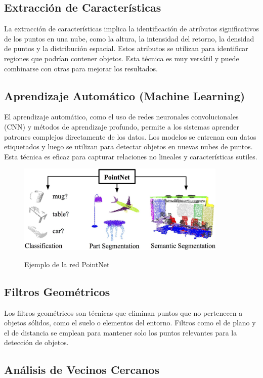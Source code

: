 \subsection{Extracción de Características}

La extracción de características implica la identificación de atributos significativos de los puntos en una nube, como la altura, la intensidad del retorno, la densidad de puntos y la distribución espacial. Estos atributos se utilizan para identificar regiones que podrían contener objetos. Esta técnica es muy versátil y puede combinarse con otras para mejorar los resultados.


\subsection{Aprendizaje Automático (Machine Learning)}

El aprendizaje automático, como el uso de redes neuronales convolucionales (CNN) y métodos de aprendizaje profundo, permite a los sistemas aprender patrones complejos directamente de los datos. Los modelos se entrenan con datos etiquetados y luego se utilizan para detectar objetos en nuevas nubes de puntos. Esta técnica es eficaz para capturar relaciones no lineales y características sutiles.

\begin{figure}[h]
\centering
\includegraphics[width=10cm]{imaxes/teaser.jpg}
\label{fig:pointnetc}
\caption{Ejemplo de la red PointNet \cite{pointnet}}
\end{figure}


\subsection{Filtros Geométricos}
Los filtros geométricos son técnicas que eliminan puntos que no pertenecen a objetos sólidos, como el suelo o elementos del entorno. Filtros como el de plano y el de distancia se emplean para mantener solo los puntos relevantes para la detección de objetos.


\subsection{Análisis de Vecinos Cercanos}

